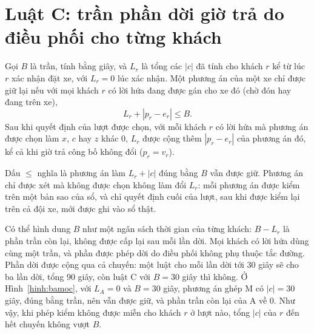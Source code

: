 \section{Luật C: trần phần dời giờ trả do điều phối cho từng khách}
\label{muc:luatc}

\begin{dinhnghia}[Luật C]
\label{dn:luatc}
Gọi $B$ là trần, tính bằng giây, và $L_r$ là tổng các $|c|$ đã tính cho khách $r$ kể từ lúc $r$ xác nhận đặt
xe, với $L_r = 0$ lúc xác nhận. Một phương án của một xe chỉ được giữ lại nếu với mọi khách $r$ có lời hứa
đang được gán cho xe đó (chờ đón hay đang trên xe),
\begin{equation}
L_r + |p_r - e_r| \le B .
\label{eq:luatc}
\end{equation}
Sau khi quyết định của lượt được chọn, với mỗi khách $r$ có lời hứa mà phương án được chọn làm $x$, $c$ hay
$z$ khác 0, $L_r$ được cộng thêm $|p_r - e_r|$ của phương án đó, kể cả khi giờ trả công bố không đổi
($p_r = v_r$).
\end{dinhnghia}

Dấu $\le$ nghĩa là phương án làm $L_r + |c|$ đúng bằng $B$ vẫn được giữ. Phương án chỉ được xét mà không được
chọn không làm đổi $L_r$: mỗi phương án được kiểm trên một bản sao của sổ, và chỉ quyết định cuối của lượt,
sau khi được kiểm lại trên cả đội xe, mới được ghi vào sổ thật.

Có thể hình dung $B$ như một ngân sách thời gian của từng khách: $B - L_r$ là phần trần còn lại, không được cấp
lại sau mỗi lần dời. Mọi khách có lời hứa dùng cùng một trần, và phần được phép dời do điều phối không phụ thuộc
tắc đường. Phần dời được cộng qua cả chuyến: một luật cho mỗi lần dời tới 30 giây sẽ cho ba lần dời, tổng 90
giây, còn luật C với $B = 30$ giây thì không. Ở Hình~\ref{hinh:bamoc}, với $L_A = 0$ và $B = 30$ giây, phương
án ghép M có $|c| = 30$ giây, đúng bằng trần, nên vẫn được giữ, và phần trần còn lại của A về 0. Như vậy, khi
phép kiểm không được miễn cho khách $r$ ở lượt nào, tổng $|c|$ của $r$ đến hết chuyến không vượt $B$.

